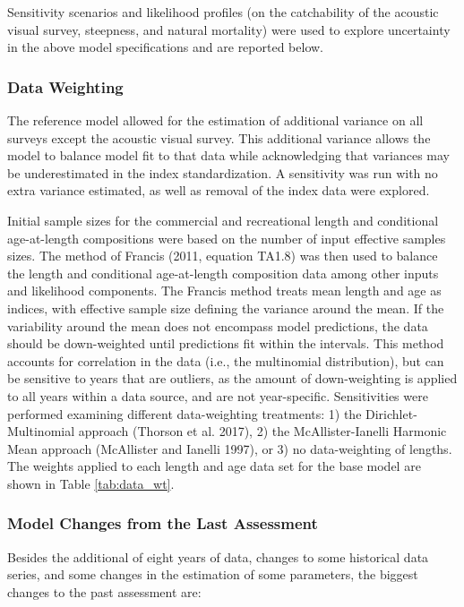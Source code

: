 \documentclass[11pt,
  english,
  letterpaper,
]{article}
\begin{document}
Sensitivity scenarios and likelihood profiles (on the catchability of the acoustic visual survey, steepness, and natural mortality) were used to explore uncertainty in the above model specifications and are reported below.

\hypertarget{data-weighting}{%
\subsubsection{Data Weighting}\label{data-weighting}}

The reference model allowed for the estimation of additional variance on all surveys except the acoustic visual survey. This additional variance allows the model to balance model fit to that data while acknowledging that variances may be underestimated in the index standardization. A sensitivity was run with no extra variance estimated, as well as removal of the index data were explored.

Initial sample sizes for the commercial and recreational length and conditional age-at-length compositions were based on the number of input effective samples sizes. The method of Francis (2011, equation TA1.8) was then used to balance the length and conditional age-at-length composition data among other inputs and likelihood components. The Francis method treats mean length and age as indices, with effective sample size defining the variance around the mean. If the variability around the mean does not encompass model predictions, the data should be down-weighted until predictions fit within the intervals. This method accounts for correlation in the data (i.e., the multinomial distribution), but can be sensitive to years that are outliers, as the amount of down-weighting is applied to all years within a data source, and are not year-specific. Sensitivities were performed examining different data-weighting treatments: 1) the Dirichlet-Multinomial approach (Thorson et al. 2017), 2) the McAllister-Ianelli Harmonic Mean approach (McAllister and Ianelli 1997), or 3) no data-weighting of lengths. The weights applied to each length and age data set for the base model are shown in Table \ref{tab:data_wt}.

\hypertarget{model-changes-from-the-last-assessment}{%
\subsubsection{Model Changes from the Last Assessment}\label{model-changes-from-the-last-assessment}}

Besides the additional of eight years of data, changes to some historical data series, and some changes in the estimation of some parameters, the biggest changes to the past assessment are:
\end{document}

